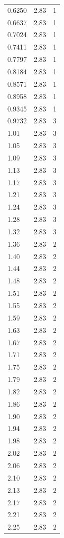 \begin{longtable}{lrr}
  0.6250 & 2.83 & 1 \\
  0.6637 & 2.83 & 1 \\
  0.7024 & 2.83 & 1 \\
  0.7411 & 2.83 & 1 \\
  0.7797 & 2.83 & 1 \\
  0.8184 & 2.83 & 1 \\
  0.8571 & 2.83 & 1 \\
  0.8958 & 2.83 & 1 \\
  0.9345 & 2.83 & 1 \\
  0.9732 & 2.83 & 3 \\
  1.01 & 2.83 & 3 \\
  1.05 & 2.83 & 3 \\
  1.09 & 2.83 & 3 \\
  1.13 & 2.83 & 3 \\
  1.17 & 2.83 & 3 \\
  1.21 & 2.83 & 3 \\
  1.24 & 2.83 & 3 \\
  1.28 & 2.83 & 3 \\
  1.32 & 2.83 & 3 \\
  1.36 & 2.83 & 2 \\
  1.40 & 2.83 & 2 \\
  1.44 & 2.83 & 2 \\
  1.48 & 2.83 & 2 \\
  1.51 & 2.83 & 2 \\
  1.55 & 2.83 & 2 \\
  1.59 & 2.83 & 2 \\
  1.63 & 2.83 & 2 \\
  1.67 & 2.83 & 2 \\
  1.71 & 2.83 & 2 \\
  1.75 & 2.83 & 2 \\
  1.79 & 2.83 & 2 \\
  1.82 & 2.83 & 2 \\
  1.86 & 2.83 & 2 \\
  1.90 & 2.83 & 2 \\
  1.94 & 2.83 & 2 \\
  1.98 & 2.83 & 2 \\
  2.02 & 2.83 & 2 \\
  2.06 & 2.83 & 2 \\
  2.10 & 2.83 & 2 \\
  2.13 & 2.83 & 2 \\
  2.17 & 2.83 & 2 \\
  2.21 & 2.83 & 2 \\
  2.25 & 2.83 & 2 \\

\end{longtable}
